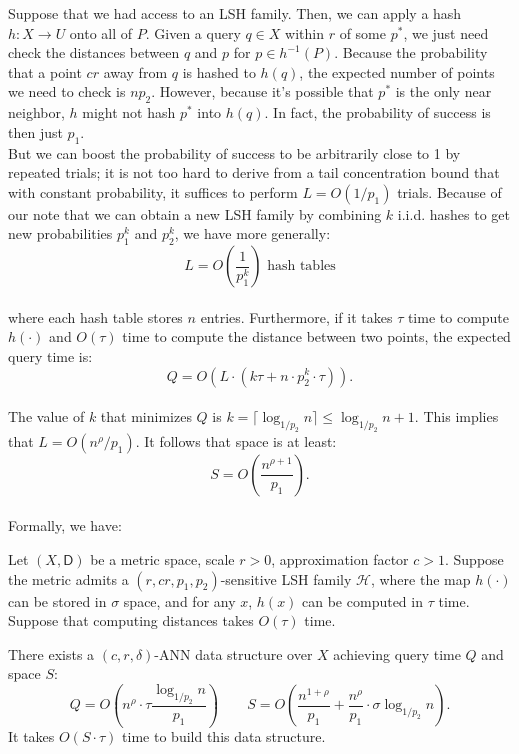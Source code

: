 Suppose that we had access to an LSH family. Then, we can apply a hash $h: X \to U$ onto all of $P$. Given a query $q \in X$ within $r$ of some $p^*$, we just need check the distances between $q$ and $p$ for $p \in h^{-1}(P)$. Because the probability that a point $cr$ away from $q$ is hashed to $h(q)$, the expected number of points we need to check is $np_2$. However, because it's possible that $p^*$ is the only near neighbor, $h$ might not hash $p^*$ into $h(q)$. In fact, the probability of success is then just $p_1$. \\

But we can boost the probability of success to be arbitrarily close to 1 by repeated trials; it is not too hard to derive from a tail concentration bound that with constant probability, it suffices to perform $L = O(1/p_1)$ trials. Because of our note that we can obtain a new LSH family by combining $k$ i.i.d. hashes to get new probabilities $p_1^k$ and $p_2^k$, we have more generally:
\[L = O\left(\frac{1}{p_1^k}\right) \textrm{ hash tables}\] \\
where each hash table stores $n$ entries. Furthermore, if it takes $\tau$ time to compute $h(\cdot)$ and $O(\tau)$ time to compute the distance between two points, the expected query time is:
\[Q = O\left(L \cdot \left(k \tau  + n \cdot p_2^k \cdot \tau\right)\right).\] \\
The value of $k$ that minimizes $Q$ is $k = \lceil \log_{1/p_2} n\rceil \leq \log_{1/p_2} n + 1$. This implies that $L = O(n^\rho / p_1)$. It follows that space is at least:
\[S = O\left(\frac{n^{\rho + 1}}{p_1}\right).\] \\
Formally, we have:
\begin{theorem}
Let $(X,\mathsf{D})$ be a metric space, scale $r > 0$, approximation factor $c > 1$. Suppose the metric admits a $(r,cr,p_1,p_2)$-sensitive LSH family $\mathcal{H}$, where the map $h(\cdot)$ can be stored in $\sigma$ space, and for any $x$, $h(x)$ can be computed in $\tau$ time. Suppose that computing distances takes $O(\tau)$ time.

There exists a $(c,r,\delta)$-ANN data structure over $X$ achieving query time $Q$ and space $S$:
\[Q = O\left(n^\rho \cdot \tau \frac{\log_{1/p_2} n}{p_1}\right)\quad\quad S = O\left(\frac{n^{1 + \rho}}{p_1} + \frac{n^\rho}{p_1} \cdot \sigma \log_{1/p_2}n\right).\]
It takes $O(S \cdot \tau)$ time to build this data structure.
\end{theorem}



